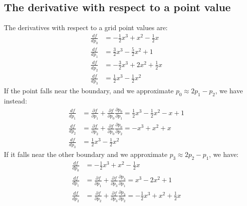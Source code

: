 \documentclass[11pt]{article}
\begin{document}

\subsection{The derivative with respect to a point value}


The derivatives with respect to a grid point values are:
\begin{equation}
\begin{split}
\frac{d f}{d p_0} &= - \frac{1}{2} x^3 + x^2 - \frac{1}{2} x \\
\frac{d f}{d p_1} &= \frac{3}{2} x^3 - \frac{5}{2} x^2 + 1 \\
\frac{d f}{d p_2} &= - \frac{3}{2} x^3 + 2 x^2 + \frac{1}{2} x \\
\frac{d f}{d p_3} &= \frac{1}{2} x^3 - \frac{1}{2} x^2
\end{split}
\label{eq:derivValue}
\end{equation}
If the point falls near the boundary, and we approximate $p_0 \approx 2 p_1 - p_2$, we have instead:
\begin{equation}
\begin{split}
\frac{d f}{d p_1} &= \frac{\partial f}{\partial p_1} + \frac{\partial f}{\partial p_0} \frac{\partial p_0}{\partial p_1} =  \frac{1}{2} x^3 - \frac{1}{2} x^2 - x + 1 \\
\frac{d f}{d p_2} &= \frac{\partial f}{\partial p_2} + \frac{\partial f}{\partial p_0} \frac{\partial p_0}{\partial p_2} = - x^3 + x^2 + x \\
\frac{d f}{d p_3} &= \frac{1}{2} x^3 - \frac{1}{2} x^2
\end{split}
\end{equation}
If it falls near the other boundary and we approximate $p_3 \approx 2 p_2 - p_1$, we have:
\begin{equation}
\begin{split}
\frac{d f}{d p_0} &= - \frac{1}{2} x^3 + x^2 - \frac{1}{2} x \\
\frac{d f}{d p_1} &= \frac{\partial f}{\partial p_1} + \frac{\partial f}{\partial p_3} \frac{\partial p_3}{\partial p_1} =  x^3 - 2 x^2 + 1 \\
\frac{d f}{d p_2} &= \frac{\partial f}{\partial p_2} + \frac{\partial f}{\partial p_3} \frac{\partial p_3}{\partial p_2} = - \frac{1}{2} x^3 + x^2 + \frac{1}{2} x
\end{split}
\end{equation}
\end{document}
